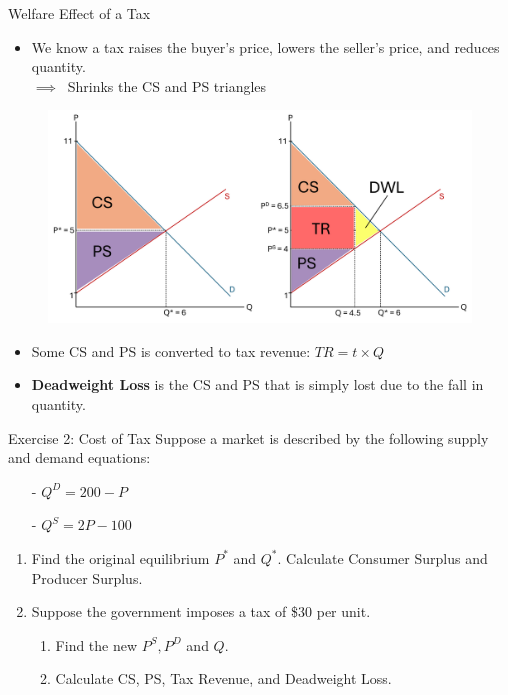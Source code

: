 \documentclass[9pt, handout]{beamer}
\begin{document}
\begin{frame}{Welfare Effect of a Tax}
    \begin{itemize}
        \item We know a tax raises the buyer's price, lowers the seller's price, and reduces quantity.\\
        $\implies \:$ Shrinks the CS and PS triangles
    \end{itemize}
    \begin{figure}
        \centering
        \includegraphics[width=0.85\linewidth]{Picture4.png}
    \end{figure}
    \begin{itemize}
        \item Some CS and PS is converted to tax revenue: $TR = t \times Q$
        \item \textbf{Deadweight Loss} is the CS and PS that is simply lost due to the fall in quantity.
    \end{itemize}
\end{frame}


\begin{frame}{Exercise 2: Cost of Tax}
    Suppose a market is described by the following supply and demand equations:
    \begin{itemize}
        \item[-] $Q^D = 200-P$
        \item[-] $Q^S = 2P-100$
    \end{itemize}
    \begin{enumerate}
        \item Find the original equilibrium $P^*$ and $Q^*$.  Calculate Consumer Surplus and Producer Surplus.
        \vspace{5pt}
        \item Suppose the government imposes a tax of \$30 per unit.  
        \vspace{5pt}
        \begin{enumerate}[a]
            \item Find the new $P^S, P^D$ and $Q$.
            \vspace{5pt}
            \item Calculate CS, PS, Tax Revenue, and Deadweight Loss.
        \end{enumerate}
    \end{enumerate}
    \vspace{1in}
\end{frame}
\end{document}
